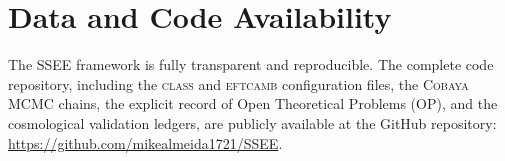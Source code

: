 \documentclass[a4paper,11pt]{article}
\begin{document}
\section*{Data and Code Availability}
The SSEE framework is fully transparent and reproducible. The complete code repository, including the \textsc{class} and \textsc{eftcamb} configuration files, the \textsc{Cobaya} MCMC chains, the explicit record of Open Theoretical Problems (OP), and the cosmological validation ledgers, are publicly available at the GitHub repository: \url{https://github.com/mikealmeida1721/SSEE}.

\clearpage

\end{document}
